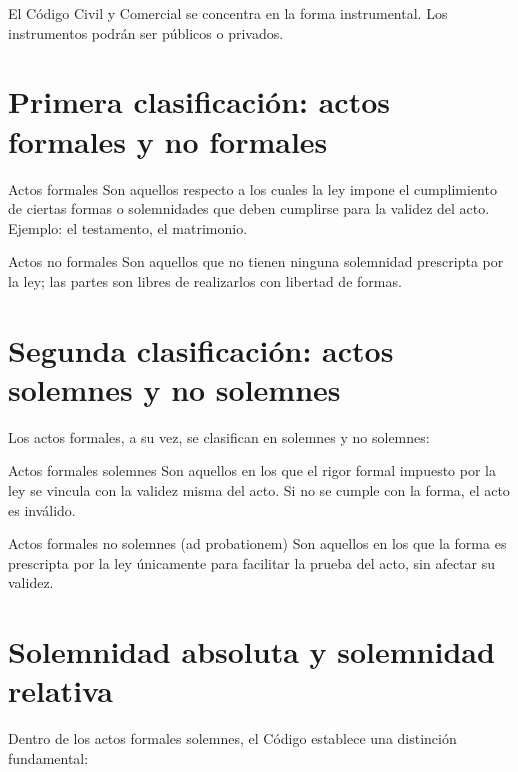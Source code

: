\documentclass[12pt,oneside]{book}
\begin{document}
El Código Civil y Comercial se concentra en la forma instrumental. Los instrumentos podrán ser públicos o privados.

\section{Primera clasificación: actos formales y no formales}

\begin{definition}{Actos formales}
Son aquellos respecto a los cuales la ley impone el cumplimiento de ciertas formas o solemnidades que deben cumplirse para la validez del acto. Ejemplo: el testamento, el matrimonio.
\end{definition}

\begin{definition}{Actos no formales}
Son aquellos que no tienen ninguna solemnidad prescripta por la ley; las partes son libres de realizarlos con libertad de formas.
\end{definition}

\section{Segunda clasificación: actos solemnes y no solemnes}

Los actos formales, a su vez, se clasifican en solemnes y no solemnes:

\begin{definition}{Actos formales solemnes}
Son aquellos en los que el rigor formal impuesto por la ley se vincula con la validez misma del acto. Si no se cumple con la forma, el acto es inválido.
\end{definition}

\begin{definition}{Actos formales no solemnes (ad probationem)}
Son aquellos en los que la forma es prescripta por la ley únicamente para facilitar la prueba del acto, sin afectar su validez.
\end{definition}

\section{Solemnidad absoluta y solemnidad relativa}

Dentro de los actos formales solemnes, el Código establece una distinción fundamental:
\end{document}
